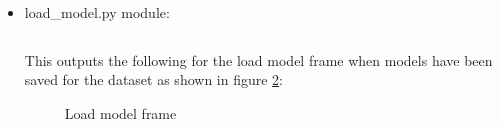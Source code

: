 \documentclass[./project-report/src/latex/project-report.tex]{subfiles}
\begin{document}
\begin{itemize}
        \pagebreak

        And outputs the following for the training frame once training has completed as shown in figure \ref{fig:training-frame-2-impl}:

        \begin{figure}[h!]
        \centering
        \caption{Training frame showing loss value against epochs}
        \label{fig:training-frame-2-impl}
        \end{figure}

    \item load\_model.py module:
        \label{sec:load_model-module}
        \inputminted{python}{./school_project/frames/load_model.py}

        This outputs the following for the load model frame when models have been saved for the dataset as shown in figure \ref{fig:load-model-frame-impl}:

        \pagebreak

        \begin{figure}[h!]
        \centering
        \caption{Load model frame}
        \label{fig:load-model-frame-impl}
        \end{figure}


\end{itemize}
\end{document}
